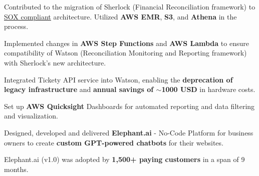 \documentclass[]{deedy-resume-openfont}
\begin{document}
\begin{tightemize}

\item Contributed to the migration of Sherlock (Financial Reconciliation framework) to \href{https://en.wikipedia.org/wiki/Sarbanes\%E2\%80\%93Oxley\_Act}{\underline{SOX compliant}} architecture. Utilized \textbf{AWS EMR}, \textbf{S3}, and \textbf{Athena} in the process.

\item Implemented changes in \textbf{AWS Step Functions} and \textbf{AWS Lambda} to ensure compatibility of Watson (Reconciliation Monitoring and Reporting framework) with Sherlock's new architecture.

\item Integrated Tickety API service into Watson, enabling the \textbf{deprecation of legacy infrastructure} and \textbf{annual savings of \(\sim \)1000 USD} in hardware costs.

\item Set up \textbf{AWS Quicksight} Dashboards for automated reporting and data filtering and visualization.

\end{tightemize}
\sectionsep

\begin{tightemize}
\item Designed, developed and delivered \textbf{Elephant.ai} - No-Code Platform for business owners to create \textbf{custom GPT-powered chatbots} for their websites.
\item Elephant.ai (v1.0) was adopted by \textbf{1,500+ paying customers} in a span of 9 months.
\end{tightemize}
\sectionsep
\end{document}
